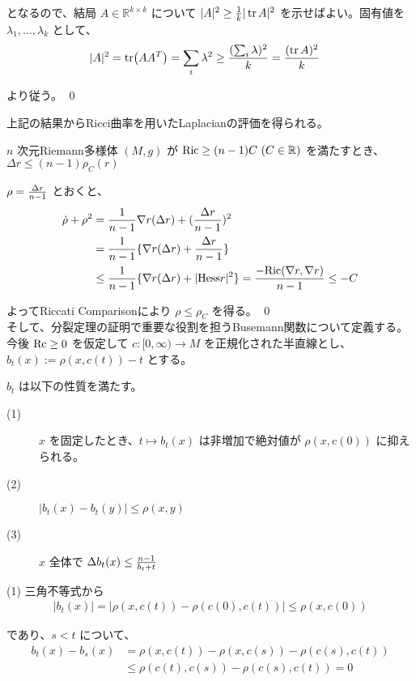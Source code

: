 \documentclass[dvipdfmx,a4paper]{jsreport}
\theoremstyle{definition}
\newcommand{\Ric}{{\rm Ric}}
\newcommand{\Rc}{{\rm Rc}}
\newcommand{\Hess}{{\rm Hess}}
\newcommand{\R}{\mathbb{R}}
\begin{document}
となるので、結局 $A\in \R^{k \times k}$ について $|A|^2 \geq {1 \over k}|\tr A|^2$ を示せばよい。固有値を $\lambda_1,\ldots,\lambda_k$ として、
\begin{align*}
    |A|^2 &= \tr(AA^T)
    = \sum_i \lambda^2
    \geq {(\sum_i \lambda)^2 \over k}={(\tr A)^2 \over k}
\end{align*}

より従う。 \qed

上記の結果からRicci曲率を用いたLaplacianの評価を得られる。

\lem $n$ 次元Riemann多様体 $(M,g)$ が $\Ric\geq (n-1)C\ (C \in \R)$ を満たすとき、$\Delta r \leq (n-1)\rho_C(r)$ 

\prf $\rho={\Delta r \over n-1}$ とおくと、
\begin{align*}
    \dot{\rho}+\rho^2 &= {1 \over n-1}\nabla r(\Delta r)+({\Delta r \over n-1})^2 \\
    &= {1 \over n-1}\{\nabla r(\Delta r)+{\Delta r \over n-1}\} \\
    &\leq {1 \over n-1}\{\nabla r(\Delta r)+|\Hess r|^2\} ={-\Ric(\nabla r,\nabla r) \over n-1}\leq -C
\end{align*}

よってRiccati Comparisonにより $\rho \leq \rho_C$ を得る。 \qed \\

そして、分裂定理の証明で重要な役割を担うBusemann関数について定義する。今後 $\Rc \geq 0$ を仮定して $c:[0,\infty) \to M$ を正規化された半直線とし、 $b_t(x):=\rho(x,c(t))-t$ とする。

\prop $b_t$ は以下の性質を満たす。
\begin{description}
    \item[(1)]$x$ を固定したとき、$t \mapsto b_t(x)$ は非増加で絶対値が $\rho(x,c(0))$ に抑えられる。
    \item[(2)]$|b_t(x)-b_t(y)| \leq \rho(x,y)$
    \item[(3)]$x$ 全体で $\Delta b_t(x) \leq {n-1 \over b_t+t}$ 
\end{description}

\prf (1) 三角不等式から
\begin{align*}
    |b_t(x)| =|\rho(x,c(t))-\rho(c(0),c(t))| \leq \rho(x,c(0))
\end{align*}

であり、$s<t$ について、
\begin{align*}
    b_t(x)-b_s(x) &=\rho(x,c(t))-\rho(x,c(s))-\rho(c(s),c(t)) \\
    &\leq \rho(c(t),c(s))-\rho(c(s),c(t))=0
\end{align*}
\end{document}
